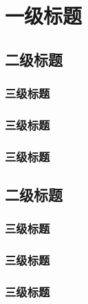 \chapter{一级标题}

\section{二级标题}

\subsection{三级标题}

\subsection{三级标题}

\subsection{三级标题}

\section{二级标题}

\subsection{三级标题}

\subsection{三级标题}

\subsection{三级标题}